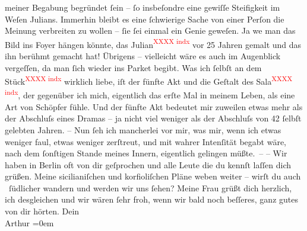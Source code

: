 \begin{ledgroupsized}[t]{13cm}
               meiner Begabung begründet ſein – ſo insbeſondre eine gewiſſe Steifigkeit im Weſen {\pb}Julians. Immerhin
               bleibt es eine ſchwierige Sache von einer Perſon die Meinung verbreiten zu wollen –
               ſie ſei einmal ein Genie geweſen. Ja we{\geminationn} man das Bild
               ins Foyer hängen könnte, das Julian\textcolor{red}{\textsuperscript{XXXX indx}} vor 25 Jahren gemalt und das ihn berühmt gemacht hat! Übrigens –
               vielleicht wäre es auch im Augenblick vergeſſen, da man ſich wieder ins Parket
               begibt.\pend
           \pstart
           Was ich ſelbſt an dem Stück\textcolor{red}{\textsuperscript{XXXX indx}}
               wirklich liebe, iſt der fünfte Akt und die {\pb}Geſtalt des Sala\textcolor{red}{\textsuperscript{XXXX indx}}, der gegenüber ich mich,
               eigentlich das erſte Mal in meinem Leben, als eine Art von Schöpfer fühle. Und der
               fünfte Akt bedeutet mir zuweilen etwas mehr als der Abschluſs eines Dramas – ja nicht
               viel weniger als der Abschluſs von 42 ſelbſt gelebten Jahren. \introOben{}–\introOben{} Nun ſeh ich mancherlei vor mir, was mir, wenn ich etwas weniger faul,
               etwas weniger zerſtreut, und mit \strikeout{\textcolor{gray}{×}\-\textcolor{gray}{×}\-\textcolor{gray}{×}\-\textcolor{gray}{×}-} wahrer Intenſität
               begabt wäre, nach dem ſonſtigen Stande meines Innern, eigentlich gelingen
               müßte. –\pend
           \pstart
           {\pb}– Wir haben in Berlin oft von dir geſprochen und alle Leute die du
               kennſt laſſen dich grüßen. Meine sicilianiſchen und
                  korfioliſchen Pläne weben weiter – wirſt du
               auch  ſüdlicher wandern und werden wir uns ſehen? Meine Frau grüßt dich herzlich, ich desgleichen und wir wären
               ſehr froh, wenn wir bald noch beſſeres, ganz gutes von dir hörten.\pend
           \pstart
           Dein{\\[\baselineskip]}\spacefill\mbox{Arthur}\pend
           \leftskip=0em{}
         
         \endnumbering{}\end{ledgroupsized}  \newcommand{\dateiname}{L01376}\newcommand{\titel}{Arthur Schnitzler an Hermann Bahr, 22. 2. 1904}\newcommand{\editorInnen}{ Kurt Ifkovits,  Martin Anton Müller}
      